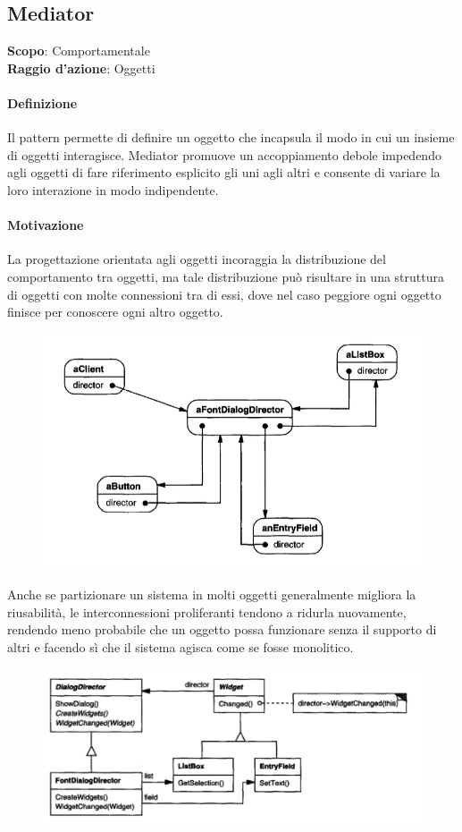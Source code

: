 \subsection{Mediator}
\label{mediator}

\textbf{Scopo}: Comportamentale \\
\textbf{Raggio d'azione}: Oggetti

\paragraph{Definizione} Il pattern permette di definire un oggetto che incapsula il modo in cui un insieme di oggetti interagisce. Mediator promuove un accoppiamento debole impedendo agli oggetti di fare riferimento esplicito gli uni agli altri e consente di variare la loro interazione in modo indipendente.

\paragraph{Motivazione} La progettazione orientata agli oggetti incoraggia la distribuzione del comportamento tra oggetti, ma tale distribuzione può risultare in una struttura di oggetti con molte connessioni tra di essi, dove nel caso peggiore ogni oggetto finisce per conoscere ogni altro oggetto.

\begin{figure}[H]
    \centering
    \includegraphics[width=0.5\linewidth]{assets/pattern/mediator/mediator-esempio-object.png}
\end{figure}

Anche se partizionare un sistema in molti oggetti generalmente migliora la riusabilità, le interconnessioni proliferanti tendono a ridurla nuovamente, rendendo meno probabile che un oggetto possa funzionare senza il supporto di altri e facendo sì che il sistema agisca come se fosse monolitico.

\begin{figure}[H]
    \centering
    \includegraphics[width=0.75\linewidth]{assets/pattern/mediator/mediator-esempio-class.png}
\end{figure}

